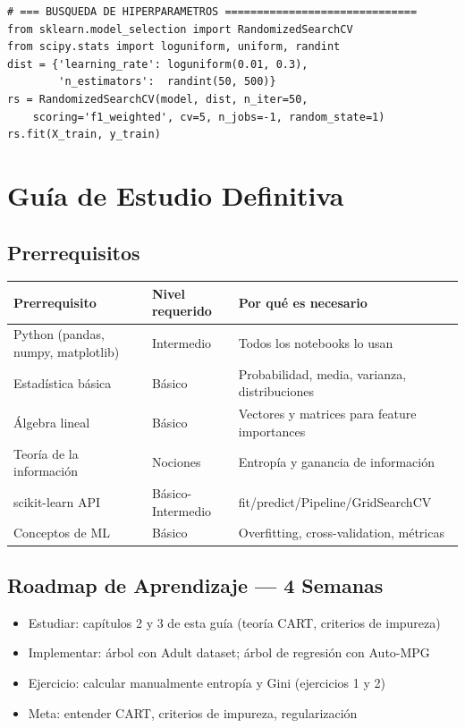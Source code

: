 \documentclass[11pt, a4paper]{book}
\begin{document}
\begin{lstlisting}[caption={Cheatsheet de código — todos los modelos}]
# === BUSQUEDA DE HIPERPARAMETROS ==============================
from sklearn.model_selection import RandomizedSearchCV
from scipy.stats import loguniform, uniform, randint
dist = {'learning_rate': loguniform(0.01, 0.3),
        'n_estimators':  randint(50, 500)}
rs = RandomizedSearchCV(model, dist, n_iter=50,
    scoring='f1_weighted', cv=5, n_jobs=-1, random_state=1)
rs.fit(X_train, y_train)
\end{lstlisting}

\chapter{Guía de Estudio Definitiva}

\section{Prerrequisitos}

\begin{center}
  \begin{tabular}{lll}
    \toprule
    \textbf{Prerrequisito} & \textbf{Nivel requerido} & \textbf{Por qué es necesario}\\
    \midrule
    Python (pandas, numpy, matplotlib) & Intermedio & Todos los notebooks lo usan\\
    Estadística básica & Básico & Probabilidad, media, varianza, distribuciones\\
    Álgebra lineal & Básico & Vectores y matrices para feature importances\\
    Teoría de la información & Nociones & Entropía y ganancia de información\\
    scikit-learn API & Básico-Intermedio & fit/predict/Pipeline/GridSearchCV\\
    Conceptos de ML & Básico & Overfitting, cross-validation, métricas\\
    \bottomrule
  \end{tabular}
\end{center}

\section{Roadmap de Aprendizaje — 4 Semanas}

\begin{tcolorbox}[colback=infobg, colframe=baggingblue, title={\faCalendar\ Semana 1 — Árboles de Decisión}]
  \begin{itemize}[noitemsep]
    \item Estudiar: capítulos 2 y 3 de esta guía (teoría CART, criterios de impureza)
    \item Implementar: árbol con Adult dataset; árbol de regresión con Auto-MPG
    \item Ejercicio: calcular manualmente entropía y Gini (ejercicios 1 y 2)
    \item Meta: entender CART, criterios de impureza, regularización
  \end{itemize}
\end{tcolorbox}
\end{document}
